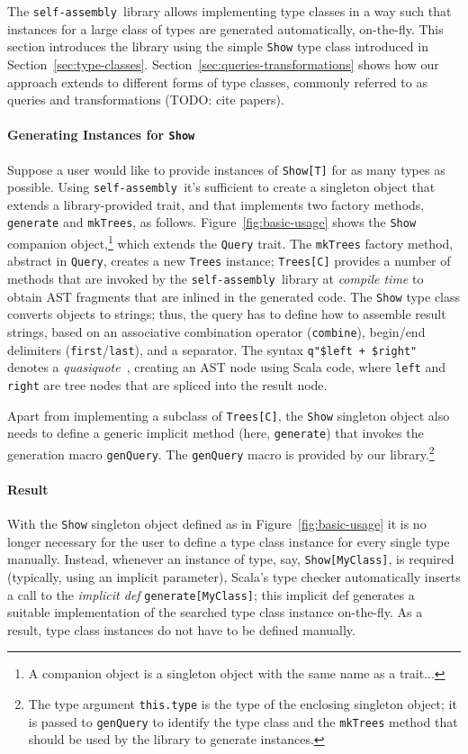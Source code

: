\documentclass[preprint]{sigplanconf}
\newcommand{\selfassembly}{\texttt{self-assembly~}}
\begin{document}
The \selfassembly library allows implementing type classes in a way such that
instances for a large class of types are generated automatically, on-the-fly.
This section introduces the library using the simple \verb|Show| type class
introduced in Section~\ref{sec:type-classes}. Section~\ref{sec:queries-transformations}
shows how our approach extends to different forms of type classes, commonly referred to
as queries and transformations (TODO: cite papers).

\paragraph{Generating Instances for \texttt{Show}} Suppose a user would like
to provide instances of \verb|Show[T]| for as many
types as possible. Using \selfassembly it's sufficient to create a singleton
object that extends a library-provided trait, and that implements two factory
methods, \verb|generate| and \verb|mkTrees|, as follows.
Figure~\ref{fig:basic-usage} shows the \verb|Show| companion object,\footnote{A companion
object is a singleton object with the same name as a trait...} which extends
the \verb|Query| trait. The \verb|mkTrees| factory method, abstract in \verb|Query|,
creates a new \verb|Trees| instance; \verb|Trees[C]| provides a number of methods that
are invoked by the \selfassembly library at \emph{compile time} to obtain AST fragments that are
inlined in the generated code. The \verb|Show| type class converts objects to
strings; thus, the query has to define how to assemble result strings, based
on an associative combination operator (\verb|combine|), begin/end delimiters
(\verb|first|/\verb|last|), and a separator. The syntax
\verb|q"$left + $right"| denotes a \emph{quasiquote}~\cite{Quasiquotes},
creating an AST node using Scala code, where \verb|left| and \verb|right|
are tree nodes that are spliced into the result node.

Apart from implementing a subclass of \verb|Trees[C]|, the \verb|Show|
singleton object also needs to define a generic implicit method (here,
\verb|generate|) that invokes the generation macro \verb|genQuery|. The
\verb|genQuery| macro is provided by our library.\footnote{The type argument
\texttt{this.type} is the type of the enclosing singleton object; it is passed
to \texttt{genQuery} to identify the type class and the \texttt{mkTrees}
method that should be used by the library to generate instances.}

\paragraph{Result} With the \verb|Show| singleton object defined as in Figure~\ref{fig:basic-usage}
it is no longer necessary for the user to define a type class instance for every single type manually.
Instead, whenever an instance of type, say, \verb|Show[MyClass]|, is required
(typically, using an implicit parameter), Scala's type checker automatically inserts
a call to the \emph{implicit def} \verb|generate[MyClass]|; this implicit def generates a
suitable implementation of the searched type class instance on-the-fly. As a result,
type class instances do not have to be defined manually.
\end{document}
